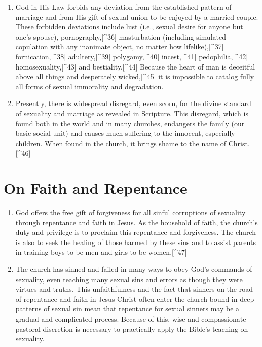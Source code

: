 \documentclass[
]{book}
\begin{document}
\begin{enumerate}
\item
  God in His Law forbids any deviation from the established pattern of marriage and from His gift of sexual union to be enjoyed by a married couple. These forbidden deviations include lust (i.e., sexual desire for anyone but one's spouse), pornography,{[}\^{}36{]} masturbation (including simulated copulation with any inanimate object, no matter how lifelike),{[}\^{}37{]} fornication,{[}\^{}38{]} adultery,{[}\^{}39{]} polygamy,{[}\^{}40{]} incest,{[}\^{}41{]} pedophilia,{[}\^{}42{]} homosexuality,{[}\^{}43{]} and bestiality.{[}\^{}44{]} Because the heart of man is deceitful above all things and desperately wicked,{[}\^{}45{]} it is impossible to catalog fully all forms of sexual immorality and degradation.
\item
  Presently, there is widespread disregard, even scorn, for the divine standard of sexuality and marriage as revealed in Scripture. This disregard, which is found both in the world and in many churches, endangers the family (our basic social unit) and causes much suffering to the innocent, especially children. When found in the church, it brings shame to the name of Christ.{[}\^{}46{]}
\end{enumerate}

\hypertarget{on-faith-and-repentance}{%
\section*{On Faith and Repentance}\label{on-faith-and-repentance}}

\begin{enumerate}
\def\labelenumi{\arabic{enumi}.}
\setcounter{enumi}{15}
\item
  God offers the free gift of forgiveness for all sinful corruptions of sexuality through repentance and faith in Jesus. As the household of faith, the church's duty and privilege is to proclaim this repentance and forgiveness. The church is also to seek the healing of those harmed by these sins and to assist parents in training boys to be men and girls to be women.{[}\^{}47{]}
\item
  The church has sinned and failed in many ways to obey God's commands of sexuality, even teaching many sexual sins and errors as though they were virtues and truths. This unfaithfulness and the fact that sinners on the road of repentance and faith in Jesus Christ often enter the church bound in deep patterns of sexual sin mean that repentance for sexual sinners may be a gradual and complicated process. Because of this, wise and compassionate pastoral discretion is necessary to practically apply the Bible's teaching on sexuality.
\end{enumerate}
\end{document}

